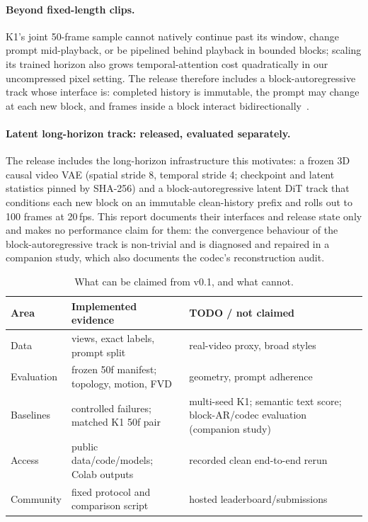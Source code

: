 \documentclass[10pt,twocolumn]{article}
\begin{document}
\paragraph{Beyond fixed-length clips.} K1's joint 50-frame sample cannot natively continue past its window, change prompt mid-playback, or be pipelined behind playback in bounded blocks; scaling its trained horizon also grows temporal-attention cost quadratically in our uncompressed pixel setting. The release therefore includes a block-autoregressive track whose interface is: completed history is immutable, the prompt may change at each new block, and frames inside a block interact bidirectionally~\cite{zhao2026ardy,magi2025}.

\paragraph{Latent long-horizon track: released, evaluated separately.} The release includes the long-horizon
infrastructure this motivates: a frozen 3D causal video VAE (spatial stride 8, temporal stride 4; checkpoint and
latent statistics pinned by SHA-256) and a block-autoregressive latent DiT track that conditions each new block on an
immutable clean-history prefix and rolls out to 100 frames at 20\,fps. This report documents their interfaces and
release state only and makes no performance claim for them: the convergence behaviour of the block-autoregressive
track is non-trivial and is diagnosed and repaired in a companion study, which also documents the codec's
reconstruction audit.

\begin{table}[t]\centering\caption{What can be claimed from v0.1, and what cannot.}\label{tab:status}\scriptsize
\begin{tabular}{@{}>{\raggedright\arraybackslash}p{}>{\raggedright\arraybackslash}p{}>{\raggedright\arraybackslash}p{}@{}}\toprule
Area & Implemented evidence & TODO / not claimed \\\midrule
Data & 3 views, exact labels, prompt split & real-video proxy, broad styles \\
Evaluation & frozen 50f manifest; topology, motion, FVD & geometry, prompt adherence \\
Baselines & controlled failures; matched K1 50f pair & multi-seed K1; semantic text score; block-AR/codec evaluation (companion study) \\
Access & public data/code/models; Colab outputs & recorded clean end-to-end rerun \\
Community & fixed protocol and comparison script & hosted leaderboard/submissions \\\bottomrule
\end{tabular}\end{table}
\end{document}
